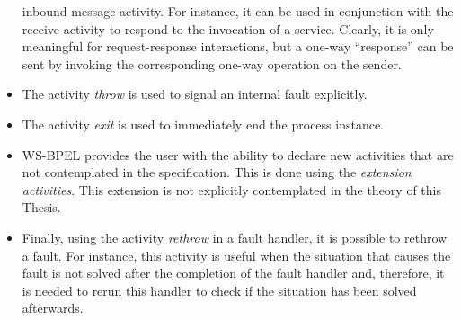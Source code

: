 \begin{itemize}
inbound message activity. For instance, it can be used in conjunction with the receive activity
to respond to the invocation of a service. Clearly, it is only meaningful
for request-response interactions, but a one-way ``response'' can be sent by invoking the
corresponding one-way operation on the sender. 
\item The activity \emph{throw} is used to signal an internal fault explicitly.
\item The activity \emph{exit} is used to immediately end the process instance.
\item WS-BPEL provides the user with the ability to declare new activities that are
not contemplated in the specification. This is done using the \emph{extension activities}. This
extension is not explicitly contemplated in the theory of this Thesis.
\item Finally, using the activity \emph{rethrow} in a fault handler, it is possible to rethrow a fault.
For instance, this activity is useful when the situation that causes the fault is not solved after
the completion of the fault handler and, therefore, it is needed to rerun this handler to check if the
situation has been solved afterwards.
\end{itemize}  

